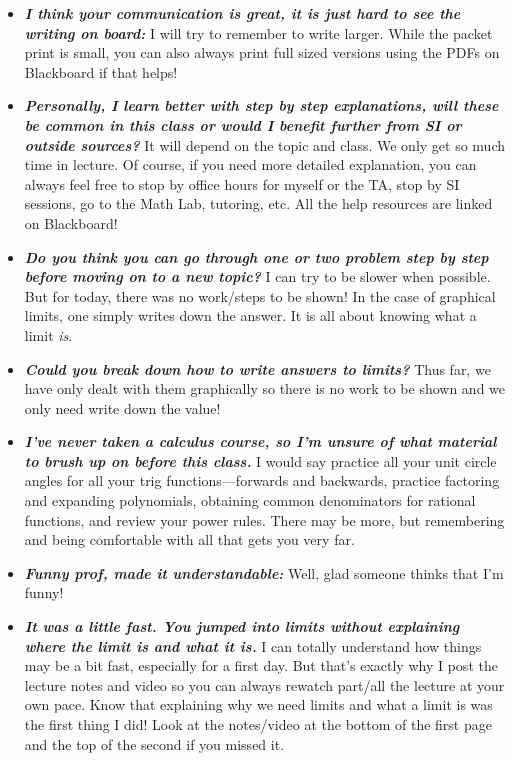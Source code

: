 \documentclass[11pt,letterpaper]{article}
\begin{document}
\begin{itemize}
\item {\bfseries\itshape I think your communication is great, it is just hard to see the writing on board:} I will try to remember to write larger. While the packet print is small, you can also always print full sized versions using the PDFs on Blackboard if that helps!

\item {\bfseries\itshape Personally, I learn better with step by step explanations, will these be common in this class or would I benefit further from SI or outside sources?} It will depend on the topic and class. We only get so much time in lecture. Of course, if you need more detailed explanation, you can always feel free to stop by office hours for myself or the TA, stop by SI sessions, go to the Math Lab, tutoring, etc. All the help resources are linked on Blackboard!

\item {\bfseries\itshape Do you think you can go through one or two problem step by step before moving on to a new topic?} I can try to be slower when possible. But for today, there was no work/steps to be shown! In the case of graphical limits, one simply writes down the answer. It is all about knowing what a limit \textit{is}. 

\item {\bfseries\itshape Could you break down how to write answers to limits?} Thus far, we have only dealt with them graphically so there is no work to be shown and we only need write down the value! 

\item {\bfseries\itshape I've never taken a calculus course, so I'm unsure of what material to brush up on before this class.} I would say practice all your unit circle angles for all your trig functions---forwards and backwards, practice factoring and expanding polynomials, obtaining common denominators for rational functions, and review your power rules. There may be more, but remembering and being comfortable with all that gets you very far. 

\item {\bfseries\itshape Funny prof, made it understandable:} Well, glad someone thinks that I'm funny!

\item {\bfseries\itshape It was a little fast. You jumped into limits without explaining where the limit is and what it is.} I can totally understand how things may be a bit fast, especially for a first day. But that's exactly why I post the lecture notes and video so you can always rewatch part/all the lecture at your own pace. Know that explaining why we need limits and what a limit is was the first thing I did! Look at the notes/video at the bottom of the first page and the top of the second if you missed it. 


\end{itemize}
\end{document}
